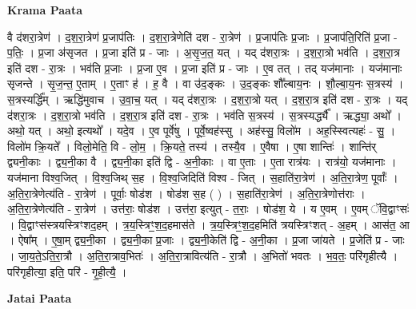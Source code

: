 \documentclass[17pt]{extarticle}
\begin{document}
\textbf{Krama Paata} \newline

वै द॑शरा॒त्रेण॑ । द॒श॒रा॒त्रेण॑ प्र॒जाप॑तिः । द॒श॒रा॒त्रेणेति॑ दश - रा॒त्रेण॑ । प्र॒जाप॑तिः प्र॒जाः । प्र॒जाप॑ति॒रिति॑ प्र॒जा - प॒तिः॒ । प्र॒जा अ॑सृजत । प्र॒जा इति॑ प्र - जाः । अ॒सृ॒ज॒त॒ यत् । यद् द॑शरा॒त्रः । द॒श॒रा॒त्रो भव॑ति । द॒श॒रा॒त्र इति॑ दश - रा॒त्रः । भव॑ति प्र॒जाः । प्र॒जा ए॒व । प्र॒जा इति॑ प्र - जाः । ए॒व तत् । तद् यज॑मानाः । यज॑मानाः सृजन्ते । सृ॒ज॒न्त॒ ए॒ताम् । ए॒ताꣳ ह॑ । ह॒ वै । वा उ॑द॒ङ्‍कः । उ॒द॒ङ्‍कः शौ᳚ल्बाय॒नः । शौ॒ल्बा॒य॒नः स॒त्रस्य॑ । स॒त्रस्यर्द्धि᳚म् । ऋद्धि॑मुवाच । उ॒वा॒च॒ यत् । यद् द॑शरा॒त्रः । द॒श॒रा॒त्रो यत् । द॒श॒रा॒त्र इति॑ दश - रा॒त्रः । यद् द॑शरा॒त्रः । द॒श॒रा॒त्रो भव॑ति । द॒श॒रा॒त्र इति॑ दश - रा॒त्रः । भव॑ति स॒त्रस्य॑ । स॒त्रस्यर्द्ध्यै᳚ । ऋद्ध्या॒ अथो᳚ । अथो॒ यत् । अथो॒ इत्यथो᳚ । यदे॒व । ए॒व पूर्वे॑षु । पूर्वे॒ष्वह॑स्सु । अह॑स्सु॒ विलो॑म । अह॒स्स्वित्यहः॑ - सु॒ । विलो॑म क्रि॒यते᳚ । विलो॒मेति॒ वि - लो॒म॒ । क्रि॒यते॒ तस्य॑ । तस्यै॒व । ए॒वैषा । ए॒षा शान्तिः॑ । शान्ति॑र् द्व्यनी॒काः । द्व्य॒नी॒का वै । द्व्य॒नी॒का इति॑ द्वि - अ॒नी॒काः । वा ए॒ताः । ए॒ता रात्र॑यः । रात्र॑यो॒ यज॑मानाः । यज॑माना विश्व॒जित् । वि॒श्व॒जिथ् स॒ह । वि॒श्व॒जिदिति॑ विश्व - जित् । स॒हाति॑रा॒त्रेण॑ । अ॒ति॒रा॒त्रेण॒ पूर्वाः᳚ । अ॒ति॒रा॒त्रेणेत्य॑ति - रा॒त्रेण॑ । पूर्वाः॒ षोड॑श । षोड॑श स॒ह ( ) । स॒हाति॑रा॒त्रेण॑ । अ॒ति॒रा॒त्रेणोत्त॑राः । अ॒ति॒रा॒त्रेणेत्य॑ति - रा॒त्रेण॑ । उत्त॑राः॒ षोड॑श । उत्त॑रा॒ इत्युत् - त॒राः॒ । षोड॑श॒ ये । य ए॒वम् । ए॒वम् ॅवि॒द्वाꣳसः॑ । वि॒द्वाꣳस॑स्त्रयस्त्रिꣳशद॒हम् । त्र॒य॒स्त्रिꣳ॒॒श॒द॒हमास॑ते । त्र॒य॒स्त्रिꣳ॒॒श॒द॒हमिति॑ त्रयस्त्रिꣳशत् - अ॒हम् । आस॑त॒ आ । ऐषा᳚म् । ए॒षा॒म् द्व्य॒नी॒का । द्व्य॒नी॒का प्र॒जाः । द्व्य॒नी॒केति॑ द्वि - अ॒नी॒का । प्र॒जा जा॑यते । प्र॒जेति॑ प्र - जाः । जा॒य॒ते॒ऽति॒रा॒त्रौ । अ॒ति॒रा॒त्राव॒भितः॑ । अ॒ति॒रा॒त्रावित्य॑ति - रा॒त्रौ । अ॒भितो॑ भवतः । भ॒व॒तः॒ परि॑गृहीत्यै । परि॑गृहीत्या॒ इति॒ परि॑ - गृ॒ही॒त्यै॒ । \newline

\textbf{Jatai Paata} \newline
\end{document}
